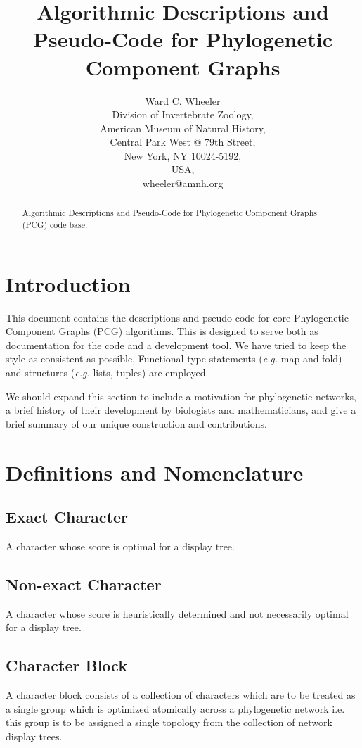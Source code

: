 \documentclass[11pt]{article}
\title{Algorithmic Descriptions and Pseudo-Code for Phylogenetic Component Graphs}
\author{Ward C. Wheeler\\
		Division of Invertebrate Zoology,\\
		American Museum of Natural History,\\
		Central Park West @ 79th Street,\\
		New York, NY 10024-5192,\\
		USA,\\
		wheeler@amnh.org}
\begin{document}
\maketitle
\begin{abstract}
	Algorithmic Descriptions and Pseudo-Code for Phylogenetic Component Graphs (PCG) code base.
\end{abstract}
\tableofcontents

\section{Introduction} \label{Introduction}
This document contains the descriptions and pseudo-code for core  Phylogenetic Component Graphs (PCG) algorithms.  
This is designed to serve both as documentation for the code and a development tool. 
We have tried to keep the style as consistent as possible, Functional-type statements (\textit{e.g.} map and fold) and structures (\textit{e.g.} lists, tuples) are employed.

We should expand this section to include a motivation for phylogenetic networks, a brief history of their development by biologists and mathematicians, and give a brief summary of our unique construction and contributions.

\section{Definitions and Nomenclature}

\subsection{Exact Character}

A character whose score is optimal for a display tree.

\subsection{Non-exact Character}

A character whose score is heuristically determined and not necessarily optimal for a display tree.

\subsection{Character Block}

A character block consists of a collection of characters which are to be treated as a single group which is optimized atomically across a phylogenetic network i.e. this group is to be assigned a single topology from the collection of network display trees.
\end{document}
